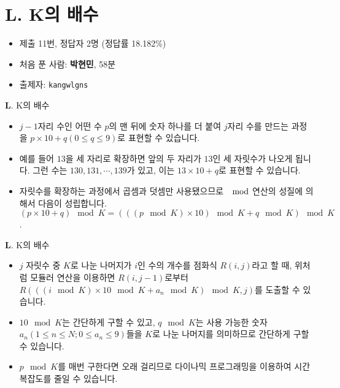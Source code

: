 \section{L. K의 배수}

\begin{frame} %
    \begin{itemize}
        \item 제출 11번, 정답자 2명 (정답률 18.182\%)
        \item 처음 푼 사람: \textbf{박현민}, 58분
        \item 출제자: \texttt{kangwlgns}
    \end{itemize}
\end{frame}

\begin{frame}{\textbf{L}. K의 배수}
    \begin{itemize}
        \item $j-1$자리 수인 어떤 수 $p$의 맨 뒤에 숫자 하나를 더 붙여 $j$자리 수를 만드는 과정을 $p \times 10+q (0 \leq q \leq 9)$로 표현할 수 있습니다.
        \item 예를 들어 $13$을 세 자리로 확장하면 앞의 두 자리가 $13$인 세 자릿수가 나오게 됩니다. 그런 수는 $130, 131, \cdots, 139$가 있고, 이는 $13 \times 10 + q$로 표현할 수 있습니다.
        \item 자릿수를 확장하는 과정에서 곱셈과 덧셈만 사용됐으므로 $\mod$연산의 성질에 의해서 다음이 성립합니다.$(p \times 10 + q) \mod K = (((p \mod K) \times 10) \mod K + q \mod K) \mod K$.
    \end{itemize}
\end{frame}

\begin{frame}{\textbf{L}. K의 배수}
    \begin{itemize}
        \item $j$ 자릿수 중 $K$로 나눈 나머지가 $i$인 수의 개수를 점화식 $R(i, j)$라고 할 때, 위처럼 모듈러 연산을 이용하면 $R(i, j-1)$로부터 $R(((i \mod K) \times 10 \mod K + a_n \mod K) \mod K, j)$를 도출할 수 있습니다.
        \item $10 \mod K$는 간단하게 구할 수 있고, $q \mod K$는 사용 가능한 숫자 $a_n (1 \leq n \leq N; 0 \leq a_n \leq 9)$들을 $K$로 나눈 나머지를 의미하므로 간단하게 구할 수 있습니다.
        \item $p \mod K$를 매번 구한다면 오래 걸리므로 다이나믹 프로그래밍을 이용하여 시간복잡도를 줄일 수 있습니다.
    \end{itemize}
\end{frame}

